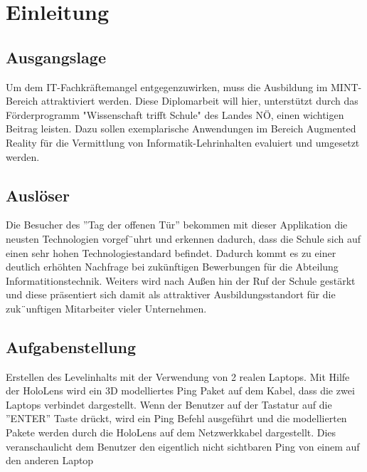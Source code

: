 \chapter{Einleitung}
\label{cha:Einleitung}

\section{Ausgangslage}
Um dem IT-Fachkräftemangel entgegenzuwirken, muss die Ausbildung im
MINT-Bereich attraktiviert werden. Diese Diplomarbeit will hier, unterstützt
durch das Förderprogramm "Wissenschaft trifft Schule" des Landes NÖ, einen
wichtigen Beitrag leisten. Dazu sollen exemplarische Anwendungen im Bereich
Augmented Reality für die Vermittlung von Informatik-Lehrinhalten evaluiert und
umgesetzt werden.

\section{Auslöser}
Die Besucher des ”Tag der offenen Tür” bekommen mit dieser Applikation die neusten
Technologien vorgef¨uhrt und erkennen dadurch, dass die Schule sich auf einen sehr hohen
Technologiestandard befindet. Dadurch kommt es zu einer deutlich erhöhten Nachfrage
bei zukünftigen Bewerbungen für die Abteilung Informatitionstechnik. Weiters wird nach
Außen hin der Ruf der Schule gestärkt und diese präsentiert sich damit als attraktiver
Ausbildungsstandort für die zuk¨unftigen Mitarbeiter vieler Unternehmen.

\section{Aufgabenstellung}
Erstellen des Levelinhalts mit der Verwendung von 2 realen Laptops. Mit
Hilfe der HoloLens wird ein 3D modelliertes Ping Paket auf dem Kabel, dass
die zwei Laptops verbindet dargestellt. Wenn der Benutzer auf der Tastatur auf
die ”ENTER” Taste drückt, wird ein Ping Befehl ausgeführt und die modellierten
Pakete werden durch die HoloLens auf dem Netzwerkkabel dargestellt. Dies veranschaulicht
dem Benutzer den eigentlich nicht sichtbaren Ping von einem auf den anderen Laptop

